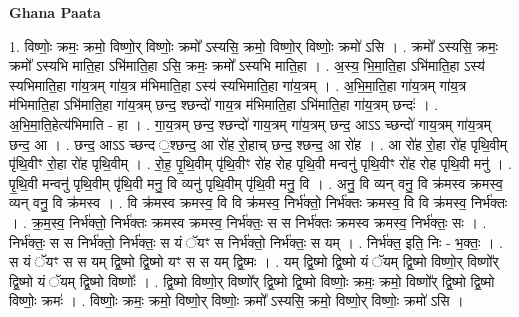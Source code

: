 \documentclass[17pt]{extarticle}
\begin{document}
\textbf{Ghana Paata } \newline

1. विष्णोः॒ क्रमः॒ क्रमो॒ विष्णो॒र् विष्णोः॒ क्रमो᳚ ऽस्यसि॒ क्रमो॒ विष्णो॒र् विष्णोः॒ क्रमो॑ ऽसि । . क्रमो᳚ ऽस्यसि॒ क्रमः॒ क्रमो᳚ ऽस्यभि माति॒हा ऽभि॑माति॒हा ऽसि॒ क्रमः॒ क्रमो᳚ ऽस्यभि माति॒हा । . अ॒स्य॒ भि॒मा॒ति॒हा ऽभि॑माति॒हा ऽस्य॑ स्यभिमाति॒हा गा॑य॒त्रम् गा॑य॒त्र म॑भिमाति॒हा ऽस्य॑ स्यभिमाति॒हा गा॑य॒त्रम् । . अ॒भि॒मा॒ति॒हा गा॑य॒त्रम् गा॑य॒त्र म॑भिमाति॒हा ऽभि॑माति॒हा गा॑य॒त्रम् छन्द॒ श्छन्दो॑ गाय॒त्र म॑भिमाति॒हा ऽभि॑माति॒हा गा॑य॒त्रम् छन्दः॑ । . अ॒भि॒मा॒ति॒हेत्य॑भिमाति - हा । . गा॒य॒त्रम् छन्द॒ श्छन्दो॑ गाय॒त्रम् गा॑य॒त्रम् छन्द॒ आऽऽ च्छन्दो॑ गाय॒त्रम् गा॑य॒त्रम् छन्द॒ आ । . छन्द॒ आऽऽ च्छन्द ॒श्छन्द॒ आ रो॑ह रो॒हाच् छन्द॒ श्छन्द॒ आ रो॑ह । . आ रो॑ह रो॒हा रो॑ह पृथि॒वीम् पृ॑थि॒वीꣳ रो॒हा रो॑ह पृथि॒वीम् । . रो॒ह॒ पृ॒थि॒वीम् पृ॑थि॒वीꣳ रो॑ह रोह पृथि॒वी मन्वनु॑ पृथि॒वीꣳ रो॑ह रोह पृथि॒वी मनु॑ । . पृ॒थि॒वी मन्वनु॑ पृथि॒वीम् पृ॑थि॒वी मनु॒ वि व्यनु॑ पृथि॒वीम् पृ॑थि॒वी मनु॒ वि । . अनु॒ वि व्यन् वनु॒ वि क्र॑मस्व क्रमस्व॒ व्यन् वनु॒ वि क्र॑मस्व । . वि क्र॑मस्व क्रमस्व॒ वि वि क्र॑मस्व॒ निर्भ॑क्तो॒ निर्भ॑क्तः क्रमस्व॒ वि वि क्र॑मस्व॒ निर्भ॑क्तः । . क्र॒म॒स्व॒ निर्भ॑क्तो॒ निर्भ॑क्तः क्रमस्व क्रमस्व॒ निर्भ॑क्तः॒ स स निर्भ॑क्तः क्रमस्व क्रमस्व॒ निर्भ॑क्तः॒ सः । . निर्भ॑क्तः॒ स स निर्भ॑क्तो॒ निर्भ॑क्तः॒ स यं ॅयꣳ स निर्भ॑क्तो॒ निर्भ॑क्तः॒ स यम् । . निर्भ॑क्त॒ इति॒ निः - भ॒क्तः॒ । . स यं ॅयꣳ स स यम् द्वि॒ष्मो द्वि॒ष्मो यꣳ स स यम् द्वि॒ष्मः । . यम् द्वि॒ष्मो द्वि॒ष्मो यं ॅयम् द्वि॒ष्मो विष्णो॒र् विष्णो᳚र् द्वि॒ष्मो यं ॅयम् द्वि॒ष्मो विष्णोः᳚ । . द्वि॒ष्मो विष्णो॒र् विष्णो᳚र् द्वि॒ष्मो द्वि॒ष्मो विष्णोः॒ क्रमः॒ क्रमो॒ विष्णो᳚र् द्वि॒ष्मो द्वि॒ष्मो विष्णोः॒ क्रमः॑ । . विष्णोः॒ क्रमः॒ क्रमो॒ विष्णो॒र् विष्णोः॒ क्रमो᳚ ऽस्यसि॒ क्रमो॒ विष्णो॒र् विष्णोः॒ क्रमो॑ ऽसि । \newline
\end{document}
